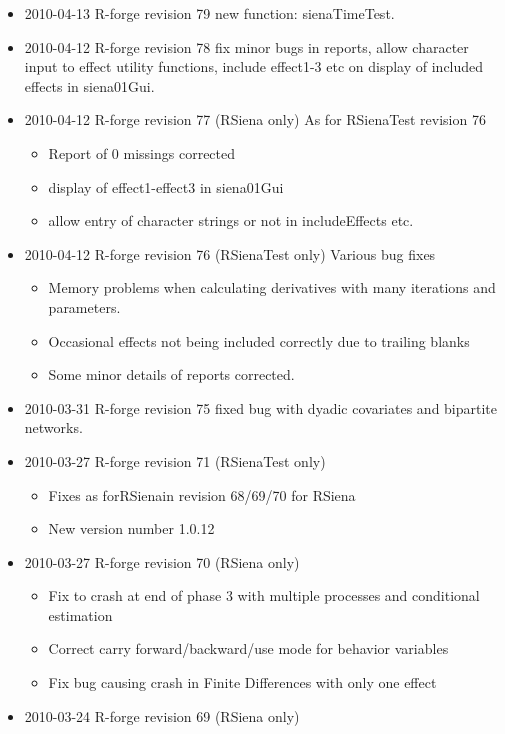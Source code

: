 \documentclass[a4paper,fleqn,11pt]{article}
\newcommand{\+}{\, + \,}
\begin{document}
\begin{small}
\begin{itemize}
\item 2010-04-13 R-forge revision 79 new function: sienaTimeTest.
\item 2010-04-12 R-forge revision 78 fix minor bugs in reports, allow character
  input to effect utility functions, include effect1-3 etc on display of
  included effects in \textsf{siena01Gui}.
\item 2010-04-12 R-forge revision 77 (RSiena only) As for \textsf{RSienaTest} revision 76
\begin{itemize}
\item Report of 0 missings corrected
\item display of effect1-effect3 in siena01Gui
\item allow entry of character strings or not in includeEffects etc.
\end{itemize}
\item 2010-04-12 R-forge revision 76 (RSienaTest only) Various bug fixes
\begin{itemize}
\item Memory problems when calculating derivatives with many iterations and
  parameters.
\item Occasional effects not being included correctly due to trailing blanks
\item Some minor details of reports corrected.
\end{itemize}
\item 2010-03-31 R-forge revision 75 fixed bug with dyadic covariates and
  bipartite networks.
\item 2010-03-27 R-forge revision 71 (RSienaTest only)
\begin{itemize}
\item Fixes as for\textsf{RSiena}in revision 68/69/70 for RSiena
\item New version number 1.0.12
\end{itemize}
\item 2010-03-27 R-forge revision 70 (RSiena only)
\begin{itemize}
\item Fix to crash at end of phase 3 with multiple processes and
conditional estimation
\item Correct carry forward/backward/use mode for behavior variables
\item Fix bug causing crash in Finite Differences with only one effect
\end{itemize}
\item 2010-03-24 R-forge revision 69 (RSiena only)
\begin{itemize}

\end{itemize}
\end{itemize}
\end{small}
\end{document}
